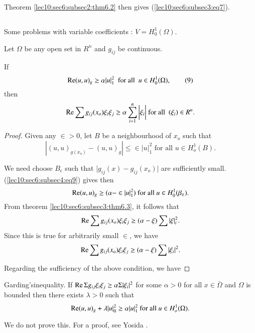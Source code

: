 Theorem \ref{lec10:sec6:subsec2:thm6.2} then gives (\ref{lec10:sec6:subsec3:eq7}). 

\subsection{}\label{lec10:sec6:subsec4} 

Some problems with variable coefficients : $V =
H^1_0(\Omega)$. 

\begin{theorem}\label{lec10:sec6:subsec4:thm6.4} %
  Let $\Omega$ be any open set in $R^n$ and $g_{ij}$ be continuous. 
  
  If
  \begin{equation*}
    \operatorname{Re}  (u , u)_g \geq \alpha |u|^2_1 ~\text{ for all }~ u \in
    H^1_0 (\Omega), \tag{9}\label{lec10:sec6:subsec4:eq9}
  \end{equation*}
  then
  $$
  \operatorname{Re}  \sum g_{ij}(x_o) \xi _i \xi _j \geq \alpha \sum_{i=1}^n \bigg|
  \xi _i\bigg| ~\text{for all }~ (\xi_i) \in R^n .
  $$
\end{theorem}

\begin{proof}
  Given any $\in > 0$, let $B$ be a neighbourhood of $x_o$ such that
  $$
  |(u, u)_{g(x_o)} - (u, u)_g | \le \in | u |^2_1 \text{ for all
  } u \in H^1_o (B). 
  $$
  
  We need choose $B_\epsilon$ such that $\Big| g_{ij}(x) - g_{ij}(x_o)\Big|$
  are sufficiently small. (\ref{lec10:sec6:subsec4:eq9}) gives then  
  $$
  \operatorname{Re}  (u , u)_g \geq (\alpha - \in |u|^2_1) \text{ for all } u
  \in H_0^1 (\beta _\in).  
  $$
From theorem \ref{lec10:sec6:subsec3:thm6.3}, it follows that  
$$
\operatorname{Re}  \sum g_{ij}(x_o) \xi_i \xi_j \geq (\alpha - \xi ) \sum |\xi|^2_i. 
$$
Since this is true for arbitrarily small $\in $, we have 
$$
\operatorname{Re}  \sum g_{ij}(x_o) \xi_i \xi_j \geq (\alpha - \xi ) \sum |\xi _i |^2. 
$$

Regarding the sufficiency of the above condition, we have 
\end{proof}

\begin{theorem}\label{lec10:sec6:subsec4:thm6.5} %
  Garding's\pageoriginale inequality. If $\operatorname{Re}  \Sigma g_{ij} \xi_i \xi_j \geq
  \alpha \Sigma |\xi_i|^2$ for some $\alpha > 0$ for all $x \in
  \bar{\Omega}$ and $\Omega$ is bounded then there exists $\lambda
  > 0$ such that  
  $$
  \operatorname{Re}  (u, u)_g + \lambda |u|^2_0 \geq \alpha |u|^2_1 \text{ for all }u
  \in H^1_o (\Omega).   
  $$
  
  We do not prove this. For a proof, see Yosida \cite{k21}.
\end{theorem}

